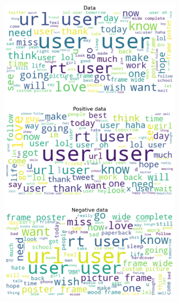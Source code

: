 \documentclass{article}
\begin{document}
\begin{itemize}
\begin{figure}[H]
\centering
\captionsetup{justification=centering}
\begin{subfigure}[b]{0.24\textwidth}
\centering
\includegraphics[width=\textwidth]{chapter-06/section-01-01/15/visualization/1/wordcloud.png}
\end{subfigure}
\begin{subfigure}[b]{0.24\textwidth}
\centering

\end{subfigure}
\end{figure}
\end{itemize}
\end{document}
